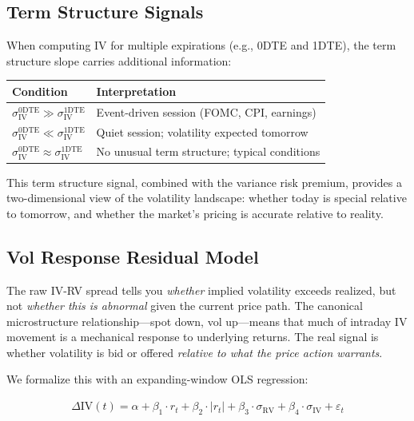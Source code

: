 \documentclass[11pt, a4paper]{article}
\begin{document}
\subsection{Term Structure Signals}

When computing IV for multiple expirations (e.g., 0DTE and 1DTE), the term structure slope carries additional information:

\begin{center}
\begin{tabular}{l|l}
\textbf{Condition} & \textbf{Interpretation} \\
\hline
$\sigma_{\text{IV}}^{0\text{DTE}} \gg \sigma_{\text{IV}}^{1\text{DTE}}$ & Event-driven session (FOMC, CPI, earnings) \\
$\sigma_{\text{IV}}^{0\text{DTE}} \ll \sigma_{\text{IV}}^{1\text{DTE}}$ & Quiet session; volatility expected tomorrow \\
$\sigma_{\text{IV}}^{0\text{DTE}} \approx \sigma_{\text{IV}}^{1\text{DTE}}$ & No unusual term structure; typical conditions \\
\end{tabular}
\end{center}

This term structure signal, combined with the variance risk premium, provides a two-dimensional view of the volatility landscape: whether today is special relative to tomorrow, and whether the market's pricing is accurate relative to reality.

\subsection{Vol Response Residual Model}

The raw IV-RV spread tells you \emph{whether} implied volatility exceeds realized, but not \emph{whether this is abnormal} given the current price path. The canonical microstructure relationship---spot down, vol up---means that much of intraday IV movement is a mechanical response to underlying returns. The real signal is whether volatility is bid or offered \emph{relative to what the price action warrants}.

We formalize this with an expanding-window OLS regression:

\begin{align}
\Delta\text{IV}(t) = \alpha + \beta_1 \cdot r_t + \beta_2 \cdot |r_t| + \beta_3 \cdot \sigma_{\text{RV}} + \beta_4 \cdot \sigma_{\text{IV}} + \varepsilon_t
\end{align}
\end{document}
